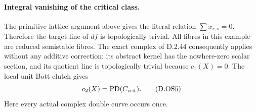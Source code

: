 \paragraph{Integral vanishing of the critical class.}
The primitive-lattice argument above gives the literal relation
\(\sum x_{r,s}=0\). Therefore the target line of \(df\) is
topologically trivial. All fibres in this example are reduced
semistable fibres. The exact complex of D.2.44 consequently
applies without any additive correction: its abstract kernel
has the nowhere-zero scalar section, and its quotient line is
topologically trivial because \(c_1(X)=0\). The local unit Bott
clutch gives
\[
                     c_2(X)=\operatorname{PD}(C_{\rm crit}).
                                                               \tag{D.OS5}
\]
Here every actual complex double curve occurs once.

